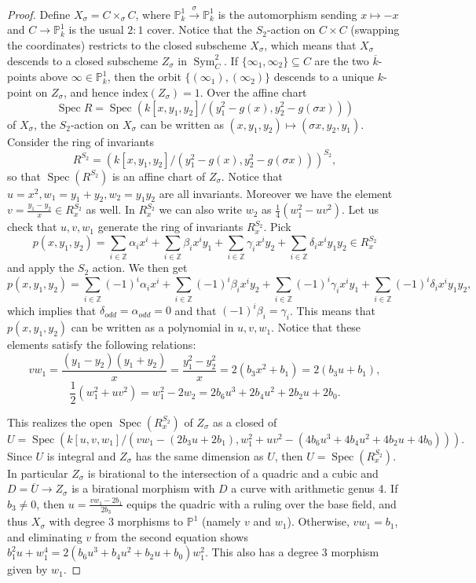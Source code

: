 \documentclass[a4paper,11pt]{amsart}
\theoremstyle{plain}
\theoremstyle{remark}
\DeclareMathOperator{\Sym}{Sym}
\DeclareMathOperator{\Spec}{Spec}
\begin{document}
\begin{proof}
    Define $X_\sigma = C \times_{\sigma} C$, where $\mathbb{P}^1_k \xrightarrow{\sigma} \mathbb{P}^1_k $ is the automorphism sending $x\mapsto -x$ and $C\to \mathbb{P}^1_k$ is the usual $2:1$ cover. 
    Notice that the $S_2$-action on $C\times C$ (swapping the coordinates) restricts to the closed subscheme $X_\sigma$, which means that $X_\sigma$ descends to a closed subscheme $Z_\sigma$ in $\Sym^2_C$. 
    If $\{\infty_1,\infty_2\}\subseteq C$ are the two $\overline{k}$-points above $\infty\in \mathbb{P}^1_k$, then the orbit $\{(\infty_1),(\infty_2)\}$ descends to a unique $k$-point on $Z_\sigma$, and hence index$(Z_\sigma)=1$.
    Over the affine chart
    \[
    \Spec R = \Spec \left( k[x ,y_1,y_2]/ (y_1^2- g( x ), y_2^2- g(\sigma x )) \right)
    \]
    of $X_\sigma$, the $S_2$-action on $X_\sigma$ can be written as $(x, y_1, y_2) \mapsto ( \sigma x, y_2, y_1)$. 
    Consider the ring of invariants
    \[
    R^{S_2} = \left( k[x ,y_1,y_2]/ (y_1^2- g( x ), y_2^2- g(\sigma x )) \right)^{S_2},
    \]
    so that $\Spec(R^{S_2})$ is an affine chart of $Z_\sigma$.
    Notice that $u=x^2, w_1= y_1+y_2,  w_2 = y_1y_2$ are all invariants.
    Moreover we have the element $v = \frac{y_1-y_2}{x}\in R_x^{S_2}$ as well.
   In $R_x^{S_2}$ we can also write $w_2$ as $\frac{1}{4}\left(w_1^2 - uv^2\right)$.
    Let us check that $u,v,w_1$ generate the ring of invariants $R_x^{S_2}$. 
    Pick 
    \[
    p(x,y_1,y_2) = \sum_{i\in \mathbb{Z}} \alpha_i x^i + \sum_{i\in \mathbb{Z}} \beta_i x^iy_1 +\sum_{i\in \mathbb{Z}} \gamma_i x^i y_2  + \sum_{i\in \mathbb{Z}} \delta_i x^i y_1y_2 \in R_x^{S_2}
    \]
    and apply the $S_2$ action.
    We then get
    \[
    p(x,y_1,y_2) = \sum_{i\in \mathbb{Z}} (-1)^i \alpha_i x^i + \sum_{i\in \mathbb{Z}} (-1)^i \beta_i x^iy_2 +\sum_{i\in \mathbb{Z}} (-1)^i \gamma_i x^i y_1  + \sum_{i\in \mathbb{Z}} (-1)^i \delta_i x^i y_1y_2,
    \]
    which implies that $\delta_{odd}=\alpha_{odd}=0$ and that $(-1)^i\beta_i=\gamma_i$.
    This means that $p(x,y_1,y_2)$ can be written as a polynomial in $u,v,w_1$.
    Notice that these elements satisfy the following relations:
    \[
    vw_1 = \frac{(y_1-y_2)(y_1+y_2)}{x} = \frac{y_1^2 - y_2^2}{x}  = 2(b_3x^2+b_1) = 2(b_3u+b_1),
    \]
    \[
    \frac{1}{2}(w_1^2+ uv^2) = w_1^2 - 2w_2 = 2b_6 u^3 + 2b_4 u^2 + 2b_2 u + 2b_0.
    \]
    
    This realizes the open $\Spec( R_x^{S_2} )$ of $Z_\sigma$ as a closed of 
    \[
        U = \Spec \left( k[u,v,w_1]/ (vw_1-(2b_3u+2b_1), w_1^2+uv^2 - (4b_6u^3 + 4b_4u^2 + 4b_2u + 4b_0)) \right).
    \]
    Since $U$ is integral and $Z_\sigma$ has the same dimension as $U$, then $U=\Spec( R_x^{S_2})$.
    In particular $Z_\sigma$ is birational to the intersection of a quadric and a cubic and  $D=\overline{U}\to Z_\sigma$ is a birational morphism with $D$ a curve with arithmetic genus 4.
    If $b_3 \neq 0$, then $u = \frac{vw_1 - 2b_1}{2b_3}$ equips the quadric with a ruling over the base field, and thus $X_\sigma$ with degree 3 morphisms to $\mathbb{P}^1$ (namely $v$ and $w_1$). Otherwise, $vw_1 = b_1$, and eliminating $v$ from the second equation shows $b_1^2 u + w_1^4 = 2(b_6 u^3 + b_4 u^2 + b_2 u + b_0)w_1^2$. This also has a degree 3 morphism given by $w_1$. 


\end{proof}
\end{document}
